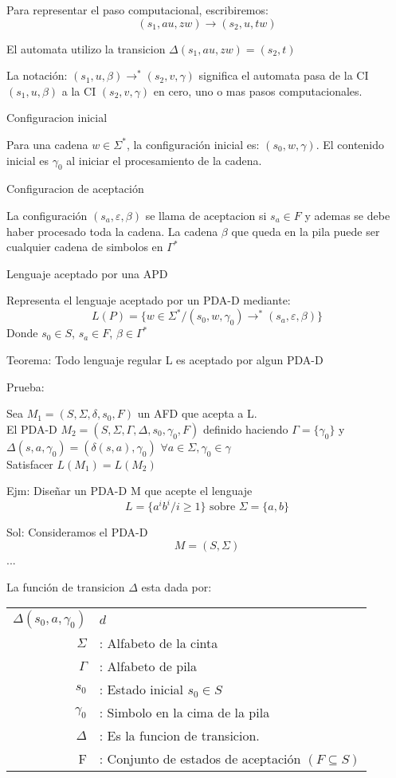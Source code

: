 Para representar el paso computacional, escribiremos:
$$
(s_1,au,zw)\rightarrow (s_2,u,tw)
$$

El automata utilizo la transicion $\Delta (s_1,au,zw) = (s_2,t)$

La notación: $(s_1,u,\beta) \rightarrow^{*}(s_2,v,\gamma) $ significa el automata pasa de la CI $(s_1,u,\beta)$ a la CI $(s_2,v,\gamma)$ en cero, uno o mas pasos computacionales.

Configuracion inicial

Para una cadena $w \in \Sigma^{*}$, la configuración inicial es: $(s_0,w,\gamma)$.
El contenido inicial es $\gamma_0$ al iniciar el procesamiento de la cadena.

Configuracion de aceptación

La configuración $(s_a,\varepsilon,\beta)$ se llama de aceptacion si $s_a \in F$ y ademas se debe haber procesado toda la cadena. La cadena $\beta$ que queda en la pila puede ser cualquier cadena de simbolos en $\Gamma^{*}$


Lenguaje aceptado por una APD

Representa el lenguaje aceptado por un PDA-D mediante:
$$
L(P) = \{w\in \Sigma^{*}/(s_0,w,\gamma_0)\rightarrow^{*}(s_a,\varepsilon,\beta) \}
$$
Donde $s_0 \in S$, $s_a \in F$, $\beta \in \Gamma^{*}$

Teorema: Todo lenguaje regular L es aceptado por algun PDA-D

Prueba:

Sea $M_1=(S,\Sigma,\delta,s_0,F)$ un AFD que acepta a L.\\
El PDA-D $M_2 = (S,\Sigma,\Gamma,\Delta,s_0,\gamma_0,F)$ definido haciendo $\Gamma = \{\gamma_0\}$ y $\Delta (s,a,\gamma_0)=(\delta(s,a),\gamma_0)$  $\forall a\in \Sigma, \gamma_0 \in \gamma$ \\

Satisfacer $L(M_1) = L(M_2)$

Ejm: Diseñar un PDA-D M que acepte el lenguaje
$$
L = \{ a^i b^i / i \geq 1\} \mbox{ sobre } \Sigma=\{a,b\}
$$

Sol: Consideramos el PDA-D
$$
M = (S,\Sigma)
$$
...

La función de transicion $\Delta$ esta dada por:\\
\begin{tabular}{rl}
$\Delta(s_0,a,\gamma_0)$			&	$d$	\\
$\Sigma$	&	: Alfabeto de la cinta	\\
$\Gamma$	&	: Alfabeto de pila	\\
$s_0$			&	: Estado inicial $s_0\in S$	\\
$\gamma_0$	&	: Simbolo en la cima de la pila\\
$\Delta$    & : Es la funcion de transicion. \\
F			&	: Conjunto de estados de aceptación $(F\subseteq S)$	\\
\end{tabular}



